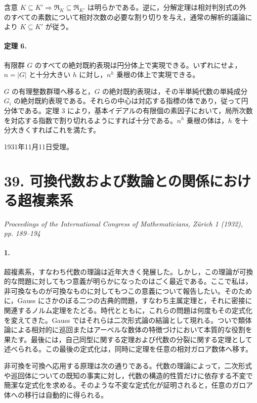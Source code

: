 含意 \(K\subseteq K'\Rightarrow\mathfrak R_K\subseteq\mathfrak R_{K'}\) は明らかである。逆に，分解定理は相対判別式の外のすべての素数について相対次数の必要な割り切りを与え，通常の解析的議論により \(K\subseteq K'\) が従う。

\paragraph{定理 6.}
有限群 \(G\) のすべての絶対既約表現は円分体上で実現できる。いずれにせよ，\(n=|G|\) と十分大きい \(h\) に対し，\(n^h\) 乗根の体上で実現できる。

\(G\) の有理整数群環へ移ると，\(G\) の絶対既約表現は，その半単純代数の単純成分 \(G_i\) の絶対既約表現である。それらの中心は対応する指標の体であり，従って円分体である。定理 3 により，基本イデアルの有限個の素因子において，局所次数を対応する指数で割り切れるようにすれば十分である。\(n^h\) 乗根の体は，\(h\) を十分大きくすればこれを満たす。

\begin{center}
1931年11月11日受理。
\end{center}

\section*{39. 可換代数および数論との関係における超複素系}

\begin{center}
\emph{Proceedings of the International Congress of Mathematicians, Zürich 1 (1932), pp. 189--194}
\end{center}

\paragraph{1.}
超複素系，すなわち代数の理論は近年大きく発展した。しかし，この理論が可換的な問題に対してもつ意義が明らかになったのはごく最近である。ここで私は，非可換なものが可換なものに対してもつこの意義について報告したい。そのために，Gauss にさかのぼる二つの古典的問題，すなわち主属定理と，それに密接に関連するノルム定理をたどる。時代とともに，これらの問題は何度もその定式化を変えてきた。Gauss ではそれらは二次形式論の結論として現れる。ついで類体論による相対的に巡回またはアーベルな数体の特徴づけにおいて本質的な役割を果たす。最後には，自己同型に関する定理および代数の分裂に関する定理として述べられる。この最後の定式化は，同時に定理を任意の相対ガロア数体へ移す。

非可換を可換へ応用する原理は次の通りである。代数の理論によって，二次形式や巡回体についての既知の事実に対し，代数の構造的性質だけに依存する不変で簡潔な定式化を求める。そのような不変な定式化が証明されると，任意のガロア体への移行は自動的に得られる。

